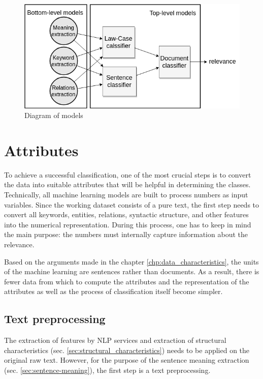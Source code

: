 \documentclass[
  digital, %
  notable,   %
  nolof,     %
  nolot,     %
]{fithesis3}
\begin{document}
\begin{figure}[H]
\caption{Diagram of models}
\label{fig:models-diagram}
\includegraphics[width=\textwidth]{img/models-diagram}
\end{figure}

\section{Attributes}
\label{sec:attributes}
To achieve a successful classification, one of the most crucial steps is to convert the data into suitable attributes that will be helpful in determining the classes.
Technically, all machine learning models are built to process numbers as input variables.
Since the working dataset consists of a pure text, the first step needs to convert all keywords, entities, relations, syntactic structure, and other features into the numerical representation.
During this process, one has to keep in mind the main purpose: the numbers must internally capture information about the relevance.

Based on the arguments made in the chapter \ref{chp:data_characteristics}, the units of the machine learning are sentences rather than documents.
As a result, there is fewer data from which to compute the attributes and the representation of the attributes as well as the process of classification itself become simpler.

\subsection{Text preprocessing}
The extraction of features by NLP services and extraction of structural characteristics (sec. \ref{sec:structural_characteristics}) needs to be applied on the original raw text.
However, for the purpose of the sentence meaning extraction (sec. \ref{sec:sentence-meaning}), the first step is a text preprocessing.
\end{document}

